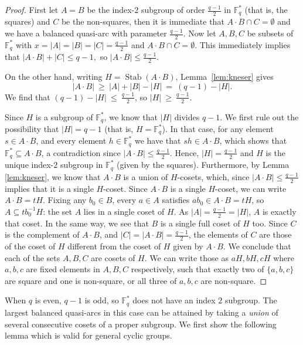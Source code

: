 \documentclass{article}
\newcommand{\F}{\mathbb{F}}
\newcommand{\Stab}{\operatorname{Stab}}
\begin{document}
\begin{proof}
First let $A=B$ be the index-$2$ subgroup of order
$\frac{q-1}{2}$ in $\F_q^*$ (that is, the squares) and $C$ be the non-squares, then it is immediate that $A\cdot B\cap C=\emptyset$ and we have a balanced quasi-arc with parameter $\frac{q-1}{2}$. 
Now let $A,B,C$ be subsets of $\F_q^*$ with $x=|A|=|B|=|C|=\frac{q-1}{2}$ and $A\cdot B\cap C=\emptyset$. This immediately implies that $|A\cdot B|+|C|\leq q-1,$ so $|A\cdot B|\leq \frac{q-1}{2}.$ 

On the other hand, writing $H=\Stab(A\cdot B)$, Lemma~\ref{lem:kneser} gives
\[
  |A\cdot B|\ \ge\ |A|+|B|-|H|\ =\ (q-1)-|H|. 
\]
We find that
$  (q-1)-|H|\ \le\ \tfrac{q-1}{2}$, so 
  $|H|\ \ge\ \tfrac{q-1}{2}$.

Since $H$ is a subgroup of $\F_q^*$, we know that $|H|$ divides $q-1$. We first rule out the possibility that $|H|=q-1$ (that is, $H=\F_q^*$). In that case, for any element $s\in A\cdot B$, and every element $h\in \F_q^\ast$ we have that $sh\in A\cdot B$, which shows that $\F_q^*\subseteq A\cdot B$, a contradiction since $|A\cdot B|\leq \frac{q-1}{2}.$ Hence, $|H|=\tfrac{q-1}{2}$ and $H$ is the unique index-$2$ subgroup in $\F_q^*$ (given by the squares). Furthermore, by Lemma \ref{lem:kneser}, we know that $A\cdot B$ is a union
of $H$-cosets, which, since $|A\cdot B|\leq \frac{q-1}{2}$ implies that it is a single $H$-coset. Since $A\cdot B$ is a single $H$-coset, we can write $A\cdot B=tH$. Fixing any
$b_0\in B$, every $a\in A$ satisfies $ab_0\in A\cdot B=tH$, so
$A\subseteq tb_0^{-1}H$: the set $A$ lies in a single coset of $H$. As
$|A|=\frac{q-1}{2}=|H|$, $A$ is exactly that coset.
In the same way, we see that $B$ is a single
full coset of $H$ too. Since $C$ is the complement of $A\cdot B$, and $|C|=|A\cdot B|=\frac{q-1}{2}$, the elements of $C$ are those of the coset of $H$ different from the coset of $H$ given by $A\cdot B$.
We conclude that each of the sets $A,B,C$ are cosets of $H$. We can write those as $aH,bH,cH$ where $a,b,c$ are fixed elements in $A,B,C$ respectively, such that exactly two of $\{a,b,c\}$ are square and one is non-square, or all three of $a,b,c$ are non-square.
\end{proof}




When $q$ is even, $q-1$ is odd, so $\F_q^*$ does not have an index $2$ subgroup. The largest balanced quasi-arcs in this case can be attained by taking a {\em union} of several consecutive cosets of a proper subgroup. We first show the following lemma which is valid for general cyclic groups.
\end{document}
